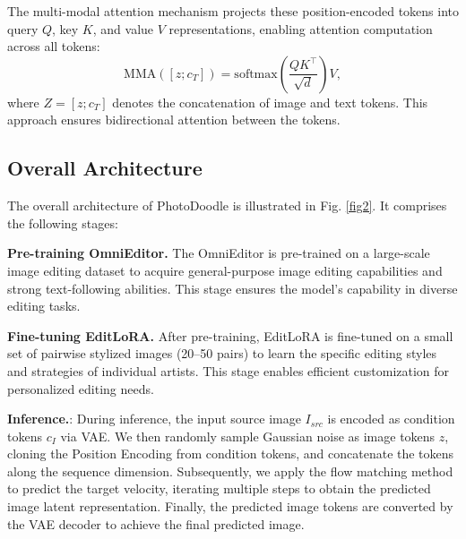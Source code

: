 The multi-modal attention mechanism projects these position-encoded tokens into query $Q$, key $K$, and value $V$ representations, enabling attention computation across all tokens:
\begin{equation}
\text{MMA}([z; c_T]) = \text{softmax}\left(\frac{QK^\top}{\sqrt{d}}\right)V,
\end{equation}
where $\mathit{Z}=[z; c_T]$ denotes the concatenation of image and text tokens. This approach ensures bidirectional attention between the tokens.





\subsection{Overall Architecture}

The overall architecture of PhotoDoodle is illustrated in Fig. \ref{fig2}. It comprises the following stages:

\noindent \textbf{Pre-training OmniEditor.} The OmniEditor is pre-trained on a large-scale image editing dataset to acquire general-purpose image editing capabilities and strong text-following abilities. This stage ensures the model's capability in diverse editing tasks.

\noindent \textbf{Fine-tuning EditLoRA.} After pre-training, EditLoRA is fine-tuned on a small set of pairwise stylized images (20–50 pairs) to learn the specific editing styles and strategies of individual artists. This stage enables efficient customization for personalized editing needs.




\noindent \textbf{Inference.}: During inference, the input source image $I_{src}$ is encoded as condition tokens $c_I$ via VAE. We then randomly sample Gaussian noise as image tokens $z$, cloning the Position Encoding from condition tokens, and concatenate the tokens along the sequence dimension. Subsequently, we apply the flow matching method to predict the target velocity, iterating multiple steps to obtain the predicted image latent representation. Finally, the predicted image tokens are converted by the VAE decoder to achieve the final predicted image. 

